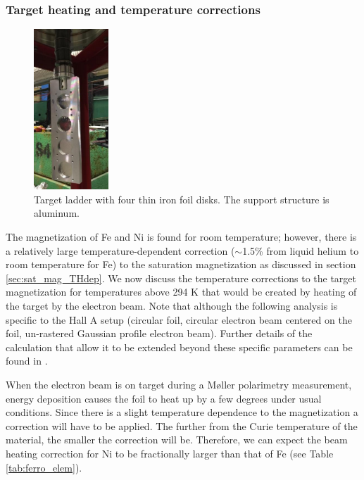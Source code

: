 \documentclass[preprint,12pt]{elsarticle}
\begin{document}
\subsubsection{\label{sec:target_heating}Target heating and temperature corrections}
\begin{figure}
\vspace{-20pt}
\centering
\includegraphics[width=0.25\textwidth]{target_ladder.png}
\caption{Target ladder with four thin iron foil disks. The support structure is aluminum.}
\label{fig:target_ladder}
\end{figure}
The magnetization of Fe and Ni is found for room temperature; however, there is a relatively large temperature-dependent correction ($\sim$1.5\% from liquid helium to room temperature for Fe) to the saturation magnetization as discussed in section \ref{sec:sat_mag_THdep}. We now discuss the temperature corrections to the target magnetization for temperatures above 294 K that would be created by heating of the target by the electron beam. Note that although the following analysis is specific to the Hall A setup (circular foil, circular electron beam centered on the foil, un-rastered Gaussian profile electron beam). 
Further details of the calculation that allow it to be extended beyond these specific parameters can be found in \cite{JonesDC2022}.

When the electron beam is on target during a M\o ller polarimetry measurement, energy deposition causes the foil to heat up by a few degrees under usual conditions. Since there is a slight temperature dependence to the magnetization a correction will have to be applied. The further from the Curie temperature of the material, the smaller the correction will be. Therefore, we can expect the beam heating correction for Ni to be fractionally larger than that of Fe (see Table \ref{tab:ferro_elem}). 
\end{document}
